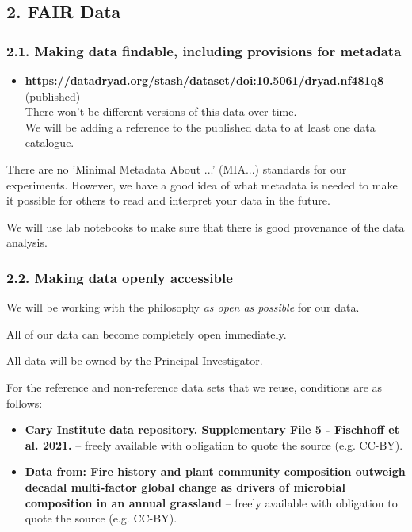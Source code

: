 \documentclass[
  english,
]{article}
\providecommand{\tightlist}{%
  \setlength{\itemsep}{0pt}\setlength{\parskip}{0pt}}
\begin{document}
\hypertarget{sec-fair-data}{}
\hypertarget{fair-data}{%
\subsection{2. FAIR Data}\label{fair-data}}

\hypertarget{making-data-findable-including-provisions-for-metadata}{%
\subsubsection{2.1. Making data findable, including provisions for
metadata}\label{making-data-findable-including-provisions-for-metadata}}

\hypertarget{q-findable}{}
\begin{itemize}
\tightlist
\item
  \textbf{https://datadryad.org/stash/dataset/doi:10.5061/dryad.nf481q8}
  (published)\\
  There won't be different versions of this data over time.\\
  We will be adding a reference to the published data to at least one
  data catalogue.
\end{itemize}

There are no 'Minimal Metadata About ...' (MIA...) standards for our
experiments. However, we have a good idea of what metadata is needed to
make it possible for others to read and interpret your data in the
future.

We will use lab notebooks to make sure that there is good provenance of
the data analysis.

\hypertarget{making-data-openly-accessible}{%
\subsubsection{2.2. Making data openly
accessible}\label{making-data-openly-accessible}}

\hypertarget{q-accessible}{}
We will be working with the philosophy \emph{as open as possible} for
our data.

All of our data can become completely open immediately.

All data will be owned by the Principal Investigator.

For the reference and non-reference data sets that we reuse, conditions
are as follows:

\begin{itemize}
\tightlist
\item
  \textbf{Cary Institute data repository. Supplementary File 5 -
  Fischhoff et al. 2021.} {--} freely available with obligation to quote
  the source (e.g. CC-BY).
\item
  \textbf{Data from: Fire history and plant community composition
  outweigh decadal multi‐factor global change as drivers of microbial
  composition in an annual grassland} {--} freely available with
  obligation to quote the source (e.g. CC-BY).
\end{itemize}
\end{document}
